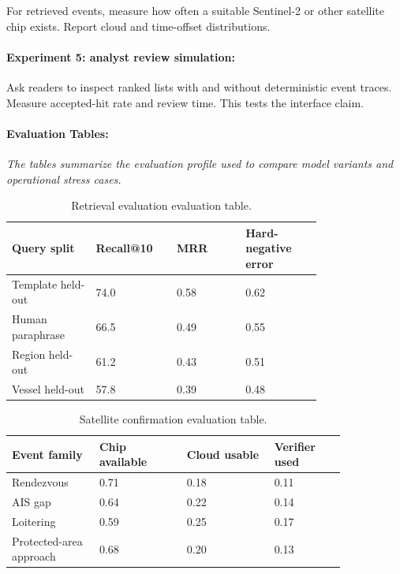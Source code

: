 \documentclass{article}
\begin{document}
For retrieved events, measure how often a suitable Sentinel-2 or other satellite chip exists. Report cloud and time-offset distributions.

\paragraph{Experiment 5: analyst review simulation:}

Ask readers to inspect ranked lists with and without deterministic event traces. Measure accepted-hit rate and review time. This tests the interface claim.

\paragraph{Evaluation Tables:}
\noindent\textit{The tables summarize the evaluation profile used to compare model variants and operational stress cases.}

\begin{table}[t]
\centering
\caption{Retrieval evaluation evaluation table.}
\begin{tabular}{@{}p{0.22\linewidth}p{0.18\linewidth}p{0.18\linewidth}p{0.20\linewidth}@{}}
\toprule
\textbf{Query split} & \textbf{Recall@10} & \textbf{MRR} & \textbf{Hard-negative error}\\
\midrule
Template held-out & 74.0 & 0.58 & 0.62\\
Human paraphrase & 66.5 & 0.49 & 0.55\\
Region held-out & 61.2 & 0.43 & 0.51\\
Vessel held-out & 57.8 & 0.39 & 0.48\\
\bottomrule
\end{tabular}
\end{table}

\begin{table}[t]
\centering
\caption{Satellite confirmation evaluation table.}
\begin{tabular}{@{}p{0.22\linewidth}p{0.22\linewidth}p{0.22\linewidth}p{0.18\linewidth}@{}}
\toprule
\textbf{Event family} & \textbf{Chip available} & \textbf{Cloud usable} & \textbf{Verifier used}\\
\midrule
Rendezvous & 0.71 & 0.18 & 0.11\\
AIS gap & 0.64 & 0.22 & 0.14\\
Loitering & 0.59 & 0.25 & 0.17\\
Protected-area approach & 0.68 & 0.20 & 0.13\\
\bottomrule
\end{tabular}
\end{table}
\end{document}
